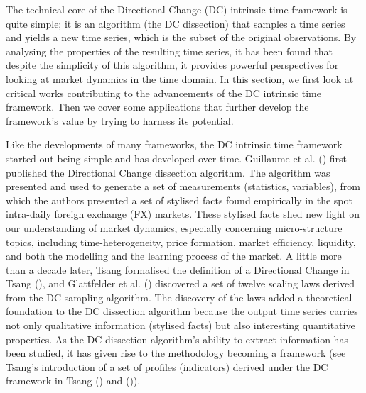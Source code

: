 The technical core of the Directional Change (DC) intrinsic time framework is quite simple; it is an algorithm (the DC dissection) that samples a time series and yields a new time series, which is the subset of the original observations. By analysing the properties of the resulting time series, it has been found that despite the simplicity of this algorithm, it provides powerful perspectives for looking at market dynamics in the time domain. In this section, we first look at critical works contributing to the advancements of the DC intrinsic time framework. Then we cover some applications that further develop the framework's value by trying to harness its potential.

Like the developments of many frameworks, the DC intrinsic time framework started out being simple and has developed over time. Guillaume et al. (\citeyear{guillaume1997bird}) first published the Directional Change dissection algorithm. The algorithm was presented and used to generate a set of measurements (statistics, variables), from which the authors presented a set of stylised facts found empirically in the spot intra-daily foreign exchange (FX) markets. These stylised facts shed new light on our understanding of market dynamics, especially concerning micro-structure topics, including time-heterogeneity, price formation, market efficiency, liquidity, and both the modelling and the learning process of the market. A little more than a decade later, Tsang formalised the definition of a Directional Change in Tsang (\citeyear{tsang2010directional}), and Glattfelder et al. (\citeyear{glattfelder2011patterns}) discovered a set of twelve scaling laws derived from the DC sampling algorithm. The discovery of the laws added a theoretical foundation to the DC dissection algorithm because the output time series carries not only qualitative information (stylised facts) but also interesting quantitative properties. As the DC dissection algorithm's ability to extract information has been studied, it has given rise to the methodology becoming a framework (see Tsang's introduction of a set of profiles (indicators) derived under the DC framework in Tsang (\citeyear{tsang2015profiling}) and (\citeyear{tsang2017profiling})).

